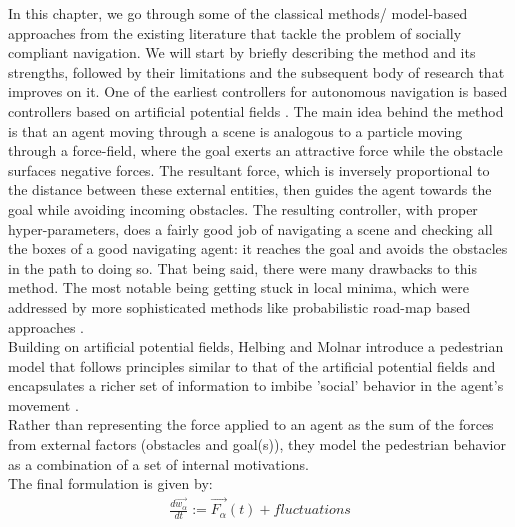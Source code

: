 In this chapter, we go through some of the classical methods/ model-based approaches from the existing literature that tackle the problem of socially compliant navigation. We will start by briefly describing the method and its strengths, followed by their limitations and the subsequent body of research that improves on it.
One of the earliest controllers for autonomous navigation is based controllers based on artificial potential fields \cite{khatib_1986}. The main idea behind the method is that an agent moving through a scene is analogous to a particle moving through a force-field, where the goal exerts an attractive force while the obstacle surfaces negative forces. The resultant force, which is inversely proportional to the distance between these external entities, then guides the agent towards the goal while avoiding incoming obstacles. The resulting controller, with proper hyper-parameters, does a fairly good job of navigating a scene and checking all the boxes of a good navigating agent: it reaches the goal and avoids the obstacles in the path to doing so. That being said, there were many drawbacks to this method. The most notable being getting stuck in local minima, which were addressed by more sophisticated methods like probabilistic road-map based approaches \cite{Lavalle98rrt}. \\

Building on artificial potential fields, Helbing and Molnar introduce a pedestrian model that follows principles similar to that of the artificial potential fields and encapsulates a richer set of information to imbibe 'social' behavior in the agent's movement \cite{helbing_social_1998}.\\

Rather than representing the force applied to an agent as the sum of the forces from external factors (obstacles and goal(s)), they model the pedestrian behavior as a combination of a set of internal motivations.\\

The final formulation is given by:
\begin{align}
\frac{d\vec{w_{\alpha}}}{dt}:=\vec{F_{\alpha}}(t)+fluctuations
\end{align}

